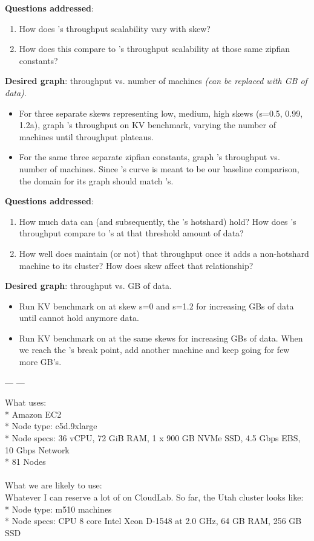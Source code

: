 \textbf{Questions addressed}: 
\begin{enumerate}
    \item How does \name{}'s throughput scalability vary with skew? 
    \item How does this compare to \dsdb{}'s throughput scalability at those same zipfian constants?
\end{enumerate}
\textbf{Desired graph}: throughput vs. number of machines \textit{(can be replaced with GB of data)}.
\begin{itemize}
    \item For three separate skews representing low, medium, high skews (s=0.5, 0.99, 1.2a), graph \name{}'s throughput on KV benchmark, varying the number of machines until throughput plateaus.
    \item For the same three separate zipfian constants, graph \dsdb{}'s throughput vs. number of machines. Since \dsdb{}'s curve is meant to be our baseline comparison, the domain for its graph should match \name{}'s. 
\end{itemize}

\textbf{Questions addressed}:
\begin{enumerate}
    \item How much data can \smdb{} (and subsequently, the \name{}'s hotshard) hold? How does \name{}'s throughput compare to \smdb{}'s at that threshold amount of data?
    \item How well does \name{} maintain (or not) that throughput once it adds a non-hotshard machine to its cluster? How does skew affect that relationship?
\end{enumerate}
\textbf{Desired graph}: throughput vs. GB of data.
\begin{itemize}
    \item Run KV benchmark on \smdb{} at skew s=0 and s=1.2 for increasing GBs of data until \smdb{} cannot hold anymore data.
    \item Run KV benchmark on \name{} at the same skews for increasing GBs of data. When we reach the \smdb{}'s break point, add another machine and keep going for few more GB's.
\end{itemize}

--- ---

What \dsdb{} uses:\\
* Amazon EC2\\
* Node type: c5d.9xlarge\\
* Node specs: 36 vCPU, 72 GiB RAM, 1 x 900 GB NVMe SSD, 4.5 Gbps EBS, 10 Gbps Network \\
* 81 Nodes\\
\\
What we are likely to use:\\
Whatever I can reserve a lot of on CloudLab. So far, the Utah cluster looks like:\\
* Node type: m510 machines\\
* Node specs: CPU 8 core Intel Xeon D-1548 at 2.0 GHz, 64 GB RAM, 256 GB SSD\\
